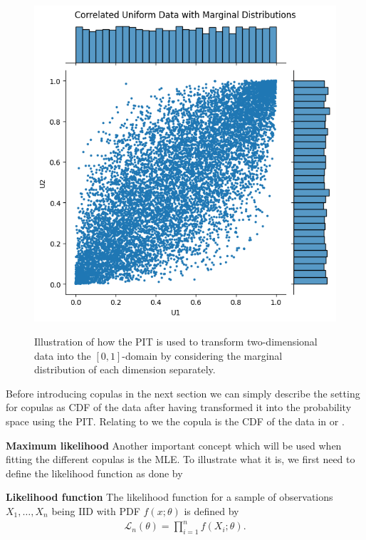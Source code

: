 \begin{figure}
\begin{minipage}{0.4\textwidth}
        \includegraphics[width=\textwidth]{3Theory/pictures/CorrelatedUnoformScatter.png}
        \label{fig:CorrelatedUniformScatter}
    \end{minipage}
    \caption{Illustration of how the \gls{PIT} is used to transform two-dimensional data into the $[0,1]$-domain by considering the marginal distribution of each dimension separately.}
    \label{fig:PITonData}
\end{figure}

Before introducing copulas in the next section we can simply describe the setting for copulas as \gls{CDF} of the data after having transformed it into the probability space using the \gls{PIT}. Relating to  we the copula is the \gls{CDF} of the data in  or .


\textbf{Maximum likelihood}
Another important concept which will be used when fitting the different copulas is the \gls{MLE}. To illustrate what it is, we first need to define the likelihood function as done by 
\begin{definition}
    \textbf{Likelihood function}
    The likelihood function for a sample of observations $X_1,\dots,X_n$ being $\mathrm{IID}$ with \gls{PDF} $f(x;\theta)$ is defined by 
    \begin{align*}
        \mathcal{L}_n(\theta) = \prod_{i=1}^n f(X_i;\theta).
    \end{align*}
\end{definition}

